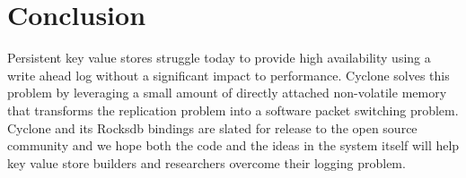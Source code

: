 \documentclass[pageno]{jpaper}
\begin{document}
\section{Conclusion}
Persistent key value stores struggle today to provide high availability using a
write ahead log without a significant impact to performance. Cyclone solves this
problem by leveraging a small amount of directly attached non-volatile memory
that transforms the replication problem into a software packet switching
problem. Cyclone and its Rocksdb bindings are slated for release to the open
source community and we hope both the code and the ideas in the system itself
will help key value store builders and researchers overcome their logging
problem.
\newcommand\myurl[2]{\url{#1}}


\end{document}
